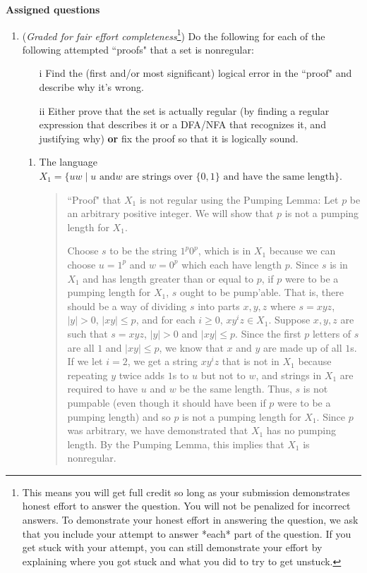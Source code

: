 \documentclass[12pt, oneside]{article}
\begin{document}
\newpage
{\bf Assigned questions}
\begin{enumerate}
\item ({\it Graded for fair effort completeness}\footnote{This means 
you will get full credit so long as your submission demonstrates honest 
effort to answer the question. You will not be penalized for incorrect answers. 
To demonstrate your honest effort in answering the question, we ask that you 
include your attempt to answer *each* part of the question. If you get stuck 
with your attempt, you can still demonstrate your effort by explaining where 
you got stuck and what you did to try to get unstuck.})
Do the following for each of the following attempted ``proofs" that  a set is nonregular:
\begin{itemize}
\item[i] Find the (first and/or most significant) logical error in the ``proof" and describe why it's wrong.
\item[ii] Either prove that the set is actually regular (by finding a regular expression that describes it or 
a DFA/NFA that recognizes it, and justifying why) {\bf or} fix the proof so that it is logically sound.
\end{itemize}

\begin{enumerate}
\item The language $X_1 = \{ uw \mid \text{$u$ and
$w$ are strings over $\{0,1\}$ and have the same length} \}$.

\begin{quote}
``Proof" that $X_1$ is not regular using the Pumping Lemma: Let $p$ be 
an arbitrary positive integer. We will show that $p$ is not a pumping length for $X_1$. 

Choose $s$ to be the string $1^p 0^p$, which is in $X_1$ because
we can choose $u = 1^p$ and $w = 0^p$ which each have length $p$.
Since $s$ is in $X_1$ and has length greater than or equal to $p$, if $p$ were to be a
pumping length for $X_1$, $s$ ought to be pump'able. 
That is, there should be a way of dividing $s$ into parts $x,y,z$ where $s=xyz$,
$|y| >0$, $|xy| \leq p$, and for each $i \geq 0$, $xy^iz \in X_1$.
Suppose $x,y,z$ are such that $s = xyz$, $|y| > 0$ and $|xy| \leq p$.
Since the first $p$ letters of $s$ are all $1$ and $|xy| \leq p$, we know
that $x$ and $y$ are made up of all $1$s.  If we let $i=2$, we get 
a string $xy^iz$ that is not in $X_1$ because repeating $y$ twice adds $1$s to 
$u$ but not to $w$, and strings in $X_1$ are required to have $u$ and $w$ be the same
length. Thus, $s$ is not pumpable (even though it should have been if $p$ were to be a pumping length)
and so $p$ is not a pumping length for $X_1$.  Since $p$ was arbitrary, we have
demonstrated that $X_1$ has no pumping length.  By the Pumping Lemma, this implies that 
$X_1$ is nonregular.
\end{quote}



\end{enumerate}
\end{enumerate}
\end{document}
